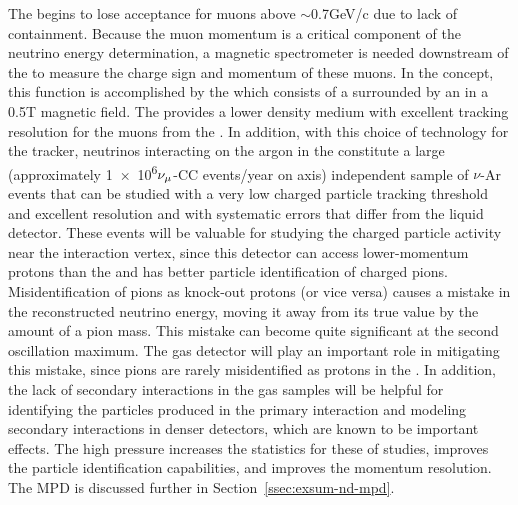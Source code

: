 The  begins to lose acceptance for muons above $\sim$\num{0.7}{GeV/c} due to lack of containment. Because the muon momentum is a critical component of the neutrino energy determination, a magnetic spectrometer is needed downstream of the  to measure the charge sign and momentum of these muons. In the   concept, this function is accomplished by the  which consists of a  surrounded by an  in a \num{0.5}{T} magnetic field. The  provides a lower density medium with excellent tracking resolution for the muons from the . In addition, with this choice of technology for the tracker, neutrinos interacting on the argon in the  constitute a large (approximately \num{1e6}$\nu_\mu$-CC events/year on axis) independent sample of $\nu$-Ar events that can be studied with a very low charged particle tracking threshold and excellent resolution and with systematic errors that differ from the liquid detector. These events will be valuable for studying the charged particle activity near the interaction vertex, since this detector can access lower-momentum protons than the  and has better particle identification of charged pions.  Misidentification of pions as knock-out protons (or vice versa) causes a mistake in the reconstructed neutrino energy, moving it away from its true value by the amount of a pion mass.  This mistake can become quite significant at the second oscillation maximum. The gas detector will play an important role in mitigating this mistake, since pions are rarely misidentified as protons in the .  In addition, the lack of secondary interactions in the gas samples will be helpful for identifying the particles produced in the primary interaction and modeling secondary interactions in denser detectors, which are known to be important effects\cite{Friedland:2018vry}. The high pressure increases the statistics for these of studies, improves the particle identification capabilities, and improves the momentum resolution. 
The MPD is discussed further in Section~\ref{ssec:exsum-nd-mpd}.



